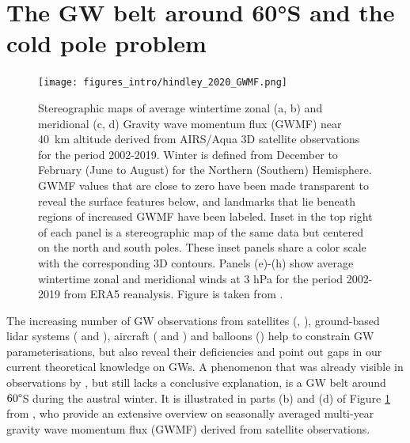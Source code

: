 \section{The GW belt around 60°S and the cold pole problem}
\label{sec:waveBelt} %
\begin{figure}[ht]
    \centering
    \texttt{[image: figures\_intro/hindley\_2020\_GWMF.png]}
    \caption{Stereographic maps of average wintertime zonal (a, b) and meridional (c, d)  Gravity wave momentum flux (GWMF) near \SI{40}{\kilo\meter} altitude derived from AIRS/Aqua 3D satellite observations for the period 2002-2019. Winter is defined from December to February (June to August) for the Northern (Southern) Hemisphere. GWMF values that are close to zero have been made transparent to reveal the surface features below, and landmarks that lie beneath regions of increased GWMF have been labeled. Inset in the top right of each panel is a stereographic map of the same data but centered on the north and south poles. These inset panels share a color scale with the corresponding 3D contours. Panels (e)-(h) show average wintertime zonal and meridional winds at 3 hPa for the period 2002-2019 from ERA5 reanalysis. Figure is taken from \cite{hindley_18year_2020}.}
    \label{fig:hindley_2020_GWMF}
\end{figure}
%
The increasing number of GW observations from satellites (\cite{hindley_gravity_2019}, \citeyear{hindley_18year_2020}), ground-based lidar systems (\cite{kaifler_lidar_2020} and  \cite{kaifler_compact_2021}), aircraft (\cite{rapp_et_al_southtrac-gw_2021} and \cite{fritts_et_al_deep_2016}) and  balloons (\cite{plougonven_gravity_2013}) help to constrain GW parameterisations, but also reveal their deficiencies and point out gaps in our current theoretical knowledge on GWs. A phenomenon that was already visible in observations by \textcite{wu_satellite_1996}, but still lacks a conclusive explanation, is a GW belt around $60 \degree$S during the austral winter. It is illustrated in parts (b) and (d) of Figure \ref{fig:hindley_2020_GWMF} from \textcite{hindley_18year_2020}, who provide an extensive overview on seasonally averaged multi-year gravity wave momentum flux (GWMF) derived from satellite observations. \\
